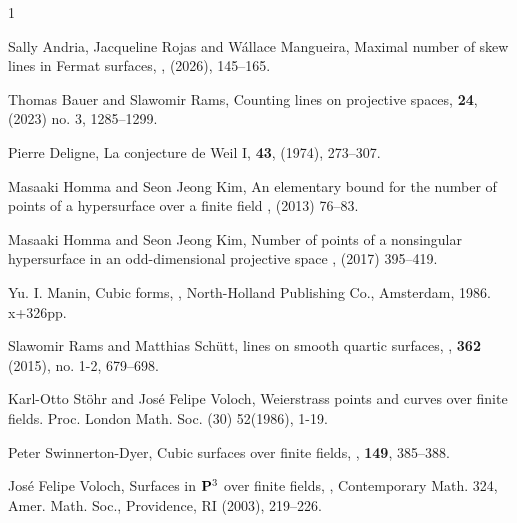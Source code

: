 \documentclass[12pt]{amsart}
\theoremstyle{definition}
\begin{document}
\bigskip

%
\begin{thebibliography}{1}

Sally Andria, Jacqueline Rojas and W\' allace Mangueira,
\newblock Maximal number of skew lines  in Fermat surfaces,
, (2026), 145--165.


Thomas Bauer and Slawomir Rams,
\newblock Counting lines on projective spaces,
 {\bf 24}, (2023) no. 3, 1285--1299.


Pierre Deligne,
\newblock La conjecture de Weil I,
 {\bf 43}, (1974), 273--307.

Masaaki Homma and Seon Jeong Kim, 
\newblock An elementary bound for the number of points of a hypersurface over a finite field
, (2013) 76--83.
 
Masaaki Homma and Seon Jeong Kim, 
\newblock Number of points of a nonsingular hypersurface in an odd-dimensional projective space
, (2017) 395--419.

Yu. I. Manin,
\newblock Cubic forms,
, North-Holland Publishing Co., Amsterdam, 1986. x+326pp.



Slawomir Rams and Matthias Sch\"utt,
 lines on smooth quartic surfaces,
, {\bf 362} (2015), no. 1-2, 679--698.

Karl-Otto St\"ohr and Jos\'e Felipe Voloch,
\newblock Weierstrass points and curves over finite fields. 
\newblock Proc. London Math. Soc. (30) 52(1986), 1-19. 

Peter Swinnerton-Dyer,
\newblock Cubic surfaces over finite fields,
, {\bf 149}, 385--388.


Jos\'e Felipe Voloch,
\newblock Surfaces in $\bold P^3$ over finite fields,
, Contemporary Math. 324, Amer. Math. Soc., Providence, RI (2003), 219--226.

\end{thebibliography}
\end{document}
